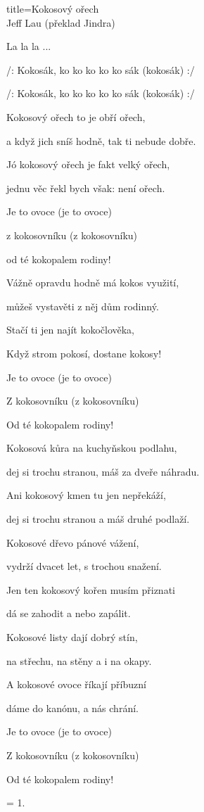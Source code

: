 \begin{song}{title=\predtitle \centering Kokosový ořech \\\large Jeff Lau (překlad Jindra) }  %

\vspace*{.5cm}

\begin{centerjustified}
\vetsi

La la la ...

/: Kokosák, ko ko ko ko ko sák (kokosák) :/

/: Kokosák, ko ko ko ko ko sák (kokosák) :/


\sloka
Kokosový ořech to je obří ořech,

a když jich sníš hodně, tak ti nebude dobře.

Jó kokosový ořech je fakt velký ořech,

jednu věc řekl bych však: není ořech.

Je to ovoce (je to ovoce)

z kokosovníku (z kokosovníku)

od té kokopalem rodiny!


\sloka
Vážně opravdu hodně má kokos využití,

můžeš vystavěti z něj dům rodinný.

Stačí ti jen najít kokočlověka,

Když strom pokosí, dostane kokosy!


Je to ovoce (je to ovoce)

Z kokosovníku (z kokosovníku)

Od té kokopalem rodiny!


\sloka
Kokosová kůra na kuchyňskou podlahu,

dej si trochu stranou, máš za dveře náhradu.

Ani kokosový kmen tu jen nepřekáží,

dej si trochu stranou a máš druhé podlaží.

Kokosové dřevo pánové vážení,

vydrží dvacet let, s trochou snažení.

Jen ten kokosový kořen musím přiznati

dá se zahodit a nebo zapálit.

Kokosové listy dají dobrý stín,

na střechu, na stěny a i na okapy.

A kokosové ovoce říkají příbuzní

dáme do kanónu, a nás chrání.


Je to ovoce (je to ovoce)

Z kokosovníku (z kokosovníku)

Od té kokopalem rodiny!

\sloka = 1.



\end{centerjustified}
\setcounter{Slokočet}{0}
\end{song}
